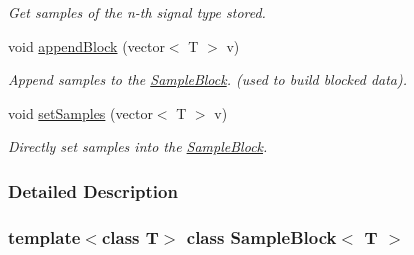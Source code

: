 \begin{DoxyCompactItemize}
\begin{DoxyCompactList}\small\item\em Get samples of the n-\/th signal type stored. \item\end{DoxyCompactList}\item 
void \hyperlink{class_sample_block_afad40888932bc8378a7598fd2546317c}{appendBlock} (vector$<$ T $>$ v)
\begin{DoxyCompactList}\small\item\em Append samples to the \hyperlink{class_sample_block}{SampleBlock}. (used to build blocked data). \item\end{DoxyCompactList}\item 
void \hyperlink{class_sample_block_acb823540844a192e12069a065cc607e8}{setSamples} (vector$<$ T $>$ v)
\begin{DoxyCompactList}\small\item\em Directly set samples into the \hyperlink{class_sample_block}{SampleBlock}. \item\end{DoxyCompactList}\end{DoxyCompactItemize}


\subsubsection{Detailed Description}
\subsubsection*{template$<$class T$>$ class SampleBlock$<$ T $>$}

